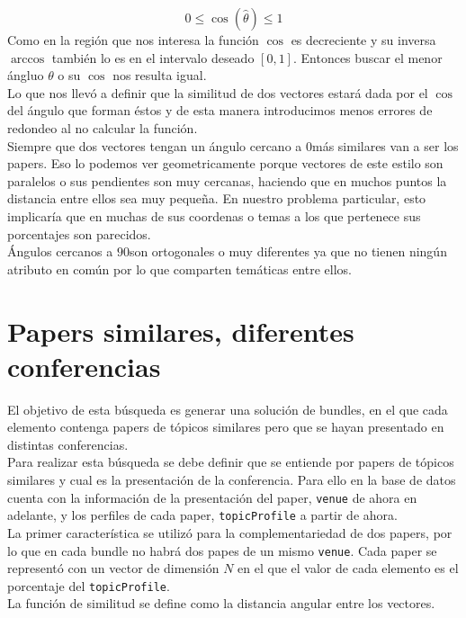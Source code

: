 $$0\leq \cos(\hat{\theta}) \leq 1$$
Como en la región que nos interesa la función $\cos$ es decreciente y su inversa $\arccos$ también lo es en el intervalo deseado $[0, 1]$. Entonces buscar el menor ángluo $\theta$ o su $\cos$ nos resulta igual.\\
Lo que nos llevó a definir que la similitud de dos vectores estará dada por el $\cos$ del ángulo que forman éstos y de esta manera introducimos menos errores de redondeo al no calcular la función.\\
Siempre que dos vectores tengan un ángulo cercano a $0$\textdegree más similares van a ser los papers. Eso lo podemos ver geometricamente porque vectores de este estilo son paralelos o sus pendientes son muy cercanas, haciendo que en muchos puntos la distancia entre ellos sea muy pequeña.  En nuestro problema particular, esto implicaría que en muchas de sus coordenas o temas a los que pertenece sus porcentajes son parecidos.\\
Ángulos cercanos a $90$\textdegree son ortogonales o muy diferentes ya que no tienen ningún atributo en común por lo que comparten temáticas entre ellos.
\section{Papers similares, diferentes conferencias}\label{bus:papSimDisLug}
El objetivo de esta búsqueda es generar una solución de bundles, en el que cada elemento contenga 
papers de tópicos similares pero que se hayan presentado en distintas conferencias.\\
Para realizar esta búsqueda se debe definir que se entiende por papers de tópicos similares y cual 
es la presentación de la conferencia. Para ello en la base de datos \cite{dataDrive} cuenta 
con la información de la presentación del paper, \texttt{venue} de ahora en adelante, y los 
perfiles de cada paper, \texttt{topicProfile} a partir de ahora.\\
La primer característica se utilizó para la complementariedad de dos papers, por lo que en cada 
bundle no habrá dos papes de un mismo \texttt{venue}. Cada paper se representó
con un vector de dimensión $N$ en el que el valor de cada elemento es el porcentaje del \texttt{topicProfile}.\\ 
La función de similitud se define como la distancia angular entre los vectores.
